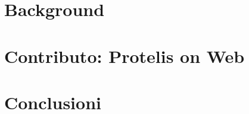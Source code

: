 \documentclass[%
  a4paper,                %
  fontsize=12pt,          %
  oneside,                %
  openany,              %
  titlepage,              %
  final                   %
  headings=standardclasses, %
  headings=big,             %
  chapterprefix=false       %
]{scrbook}
\begin{document}
  \frontmatter{}

  
  
  
  

  \tableofcontents

  \mainmatter{}

  

  \part{Background}\label{part:background}
    
    
    

  \part{Contributo: Protelis on Web}\label{part:contribution}
    
    
    

  \part{Conclusioni}\label{part:conclusion}
    
    
    

  

  \backmatter{}
  
  
\end{document}

